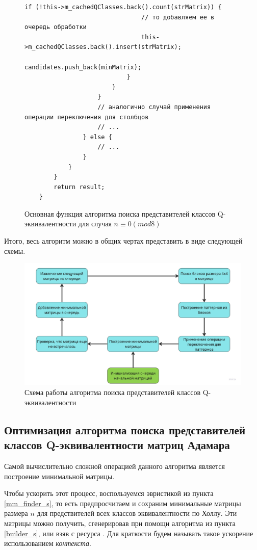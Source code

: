 \documentclass[a4paper, 14pt]{extreport}
\begin{document}
\begin{figure}[H]
\begin{minipage}{\linewidth}
\begin{lstlisting}[language=С++, tabsize=2, showspaces=false, basicstyle=\fontsize{8}{9}\selectfont, numbers=none]
                            if (!this->m_cachedQClasses.back().count(strMatrix)) {
                                // то добавляем ее в очередь обработки
                                this->m_cachedQClasses.back().insert(strMatrix);
                                candidates.push_back(minMatrix);
                            }
                        }
                    }
                    // аналогично случай применения операции переключения для столбцов
                    // ...
                } else {
                    // ...
                }
            }
        }
        return result;
    }
    \end{lstlisting}
    \end{minipage}
    \caption{Основная функция алгоритма поиска представителей классов Q-эквивалентности для случая $n \equiv 0(mod8)$}
    \label{alg:q_finder}
\end{figure}

Итого, весь алгоритм можно в общих чертах представить в виде следующей схемы.

\begin{figure}[H]
    \centering
    \includegraphics[scale=0.17]{img/plot_algo.jpg}
    \caption{Схема работы алгоритма поиска представителей классов Q-эквивалентности}
    \label{fig:algo}
\end{figure}

\subsection{Оптимизация алгоритма поиска представителей классов Q-эквивалентности матриц Адамара}

Самой вычислительно сложной операцией данного алгоритма является построение минимальной матрицы.

Чтобы ускорить этот процесс, воспользуемся эвристикой из пункта \ref{mm_finder_s}, то есть предпросчитаем и сохраним минимальные матрицы размера $n$ для предствителей всех классов эквивалентности по Холлу. Эти матрицы можно получить, сгенерировав при помощи алгоритма из пункта \ref{builder_s}, или взяв с ресурса \cite{sloane:lhm}. Для краткости будем называть такое ускорение использованием {\it контекста}.
\end{document}
